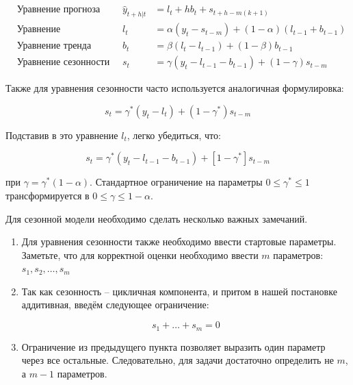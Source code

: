 \documentclass[12pt,fleqn]{article}
\begin{document}
\begin{equation}
  \begin{array}{llll}
    &\text{Уравнение прогноза} \quad &   \hat{y}_{t+h|t} & = l_t + h b_t + s_{t+h-m(k+1)}\\
    &\text{Уравнение сглаживания}\quad & l_t & =\alpha (y_t - s_{t-m}) +(1-\alpha)(l_{t-1} + b_{t-1}) \\
    &\text{Уравнение тренда}\quad & b_t & =\beta (l_t - l_{t-1}) +(1-\beta) b_{t-1} \\
    &\text{Уравнение сезонности}\quad & s_t & =\gamma (y_t - l_{t-1} - b_{t-1}) +(1-\gamma) s_{t-m}
  \end{array}
\end{equation}

Также для уравнения сезонности часто используется аналогичная формулировка:

\begin{equation}
  s_t  =\gamma^{\ast} (y_t - l_{t}) +(1-\gamma^{\ast}) s_{t-m}
\end{equation}

Подставив в это уравнение $l_t$, легко убедиться, что:

\begin{equation}
  s_t = \gamma^* (y_t - l_{t-1} - b_{t-1}) + [1 - \gamma^*] s_{t-m}
\end{equation}

при $\gamma = \gamma^*(1-\alpha)$.
Стандартное ограничение на параметры $0 \leq \gamma^* \leq 1$ трансформируется в $0 \leq \gamma \leq 1-\alpha$.

Для сезонной модели необходимо сделать несколько важных замечаний.

\begin{enumerate}
  \item Для уравнения сезонности также необходимо ввести стартовые параметры.
  Заметьте, что для корректной оценки необходимо ввести $m$ параметров: $s_1, s_2, \ldots, s_m$

  \item Так как сезонность -- цикличная компонента, и притом в нашей постановке аддитивная, введём следующее ограничение:

    \begin{equation}
      s_1 + \ldots + s_m = 0
    \end{equation}

  \item Ограничение из предыдущего пункта позволяет выразить один параметр через все остальные.
  Следовательно, для задачи достаточно определить не $m$, а $m-1$ параметров.
\end{enumerate}
\end{document}
